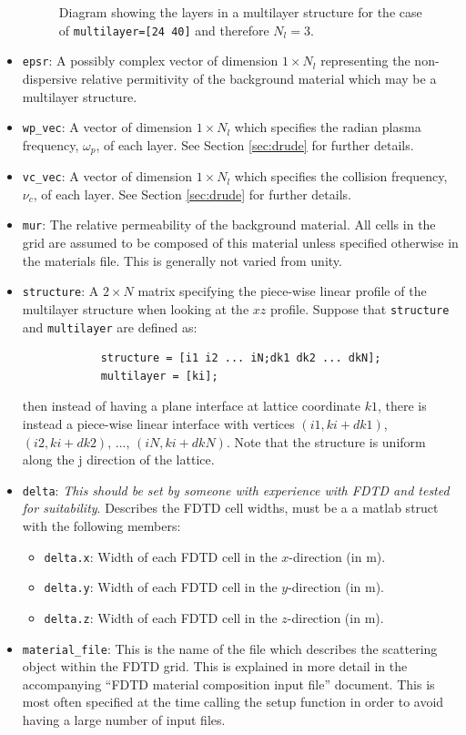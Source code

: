 \documentclass[a4paper, 12pt]{article}
\begin{document}
\begin{itemize}
\begin{figure}[h]
\begin{center}
				\caption{Diagram showing the layers in a multilayer structure for the
					case of \texttt{multilayer=[24 40]} and therefore $N_l =3$.}
				\label{fig:multilayer}
			\end{center}
		\end{figure}
		\item \verb+epsr+: A  possibly complex vector of dimension $1\times
		N_l$ representing the non-dispersive relative permitivity of the background
		material which may be a multilayer structure.
		\item \verb+wp_vec+: A vector of dimension $1\times N_l$ which
		specifies the radian plasma frequency, $\omega_p$, of each
		layer. See Section \ref{sec:drude} for further details.
		\item \verb+vc_vec+: A vector of dimension $1\times N_l$ which
		specifies the collision frequency, $\nu_c$, of each layer. See
		Section \ref{sec:drude} for further details.
		
		\item \verb+mur+: The relative permeability of the background
		material. All cells in the grid are assumed to be composed of this
		material unless specified otherwise in the materials file. This is
		generally not varied from unity.
		\item \verb+structure+: A $2\times N$ matrix specifying the piece-wise
		linear profile of the multilayer structure when looking at the $xz$
		profile. Suppose that \verb+structure+ and \verb+multilayer+ are defined as:
		\begin{verbatim}
			structure = [i1 i2 ... iN;dk1 dk2 ... dkN];
			multilayer = [ki];
		\end{verbatim}
		then instead of having a plane interface at lattice coordinate $k1$,
		there is instead a piece-wise linear interface with vertices
		$(i1,ki+dk1)$, $(i2,ki+dk2)$, ..., $(iN,ki+dkN)$. Note that the
		structure is uniform along the j direction of the lattice.
		\item \verb+delta+: \emph{This should be set by someone with
			experience with FDTD and tested for suitability}. Describes the FDTD cell widths, must be a a matlab struct with the following members:
		\begin{itemize}
			\item \verb+delta.x+: Width of each FDTD cell in the $x$-direction
			(in m).
			\item \verb+delta.y+: Width of each FDTD cell in the $y$-direction
			(in m).
			\item \verb+delta.z+: Width of each FDTD cell in the $z$-direction
			(in m).
		\end{itemize}
		
		\item \verb+material_file+: This is the name of the file which
		describes the scattering object within the FDTD grid. This is
		explained in more detail in the accompanying ``FDTD
		material composition input file'' document. This is most often
		specified at the time calling the setup function in order to avoid
		having a large number of input files.
	\end{itemize}
\end{document}

